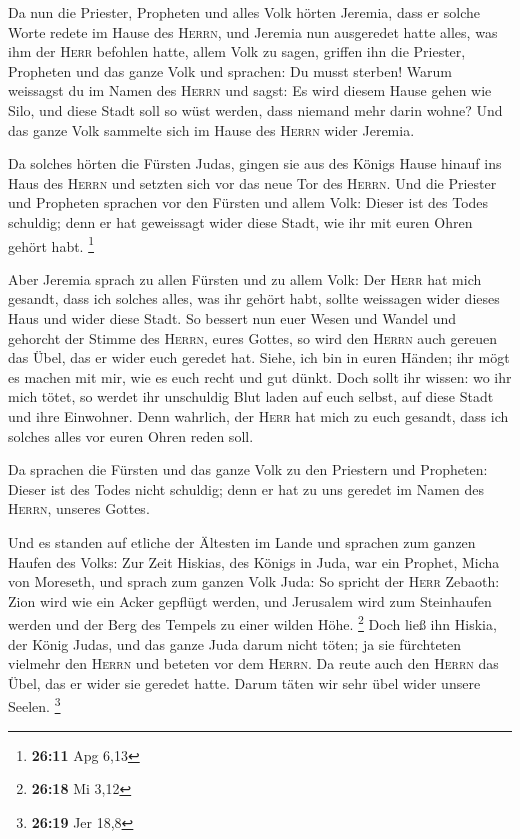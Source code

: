  Da nun die Priester, Propheten und alles Volk hörten
Jeremia, dass er solche Worte redete im Hause des \textsc{Herrn},
 und Jeremia nun ausgeredet hatte alles, was ihm der
\textsc{Herr} befohlen hatte, allem Volk zu sagen, griffen ihn die
Priester, Propheten und das ganze Volk und sprachen: Du musst sterben!
 Warum weissagst du im Namen des \textsc{Herrn} und sagst:
Es wird diesem Hause gehen wie Silo, und diese Stadt soll so wüst
werden, dass niemand mehr darin wohne? Und das ganze Volk sammelte sich
im Hause des \textsc{Herrn} wider Jeremia.

 Da solches hörten die Fürsten Judas, gingen sie aus des
Königs Hause hinauf ins Haus des \textsc{Herrn} und setzten sich vor das
neue Tor des \textsc{Herrn}.  Und die Priester und
Propheten sprachen vor den Fürsten und allem Volk: Dieser ist des Todes
schuldig; denn er hat geweissagt wider diese Stadt, wie ihr mit euren
Ohren gehört habt. \footnote{\textbf{26:11} Apg 6,13}

 Aber Jeremia sprach zu allen Fürsten und zu allem Volk:
Der \textsc{Herr} hat mich gesandt, dass ich solches alles, was ihr
gehört habt, sollte weissagen wider dieses Haus und wider diese Stadt.
 So bessert nun euer Wesen und Wandel und gehorcht der
Stimme des \textsc{Herrn}, eures Gottes, so wird den \textsc{Herrn} auch
gereuen das Übel, das er wider euch geredet hat.  Siehe,
ich bin in euren Händen; ihr mögt es machen mit mir, wie es euch recht
und gut dünkt.  Doch sollt ihr wissen: wo ihr mich tötet,
so werdet ihr unschuldig Blut laden auf euch selbst, auf diese Stadt und
ihre Einwohner. Denn wahrlich, der \textsc{Herr} hat mich zu euch
gesandt, dass ich solches alles vor euren Ohren reden soll.

 Da sprachen die Fürsten und das ganze Volk zu den
Priestern und Propheten: Dieser ist des Todes nicht schuldig; denn er
hat zu uns geredet im Namen des \textsc{Herrn}, unseres Gottes.

 Und es standen auf etliche der Ältesten im Lande und
sprachen zum ganzen Haufen des Volks:  Zur Zeit Hiskias,
des Königs in Juda, war ein Prophet, Micha von Moreseth, und sprach zum
ganzen Volk Juda: So spricht der \textsc{Herr} Zebaoth: Zion wird wie
ein Acker gepflügt werden, und Jerusalem wird zum Steinhaufen werden und
der Berg des Tempels zu einer wilden Höhe. \footnote{\textbf{26:18} Mi
  3,12}  Doch ließ ihn Hiskia, der König Judas, und das
ganze Juda darum nicht töten; ja sie fürchteten vielmehr den
\textsc{Herrn} und beteten vor dem \textsc{Herrn}. Da reute auch den
\textsc{Herrn} das Übel, das er wider sie geredet hatte. Darum täten wir
sehr übel wider unsere Seelen. \footnote{\textbf{26:19} Jer 18,8}

